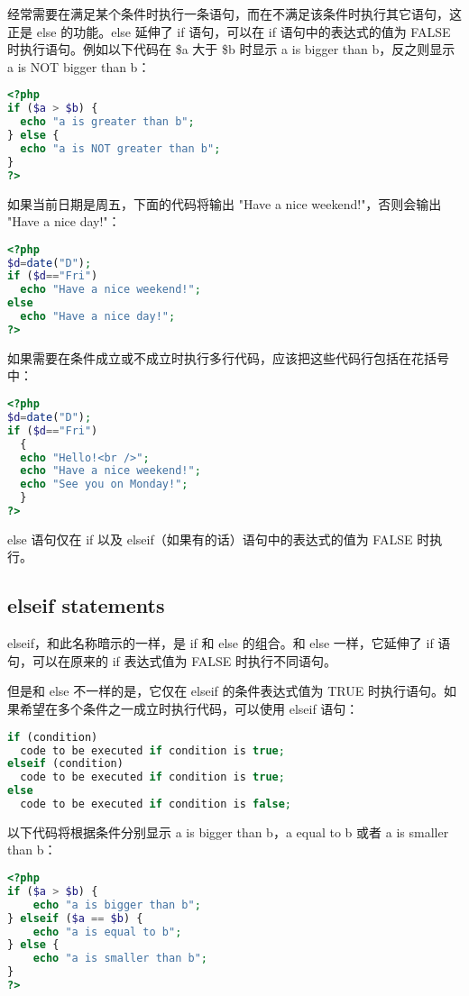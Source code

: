 经常需要在满足某个条件时执行一条语句，而在不满足该条件时执行其它语句，这正是 else 的功能。else 延伸了 if 语句，可以在 if 语句中的表达式的值为 FALSE 时执行语句。例如以下代码在 \$a 大于 \$b 时显示 a is bigger than b，反之则显示 a is NOT bigger than b：


\begin{lstlisting}[language=PHP]
<?php
if ($a > $b) {
  echo "a is greater than b";
} else {
  echo "a is NOT greater than b";
}
?>
\end{lstlisting}

如果当前日期是周五，下面的代码将输出 "Have a nice weekend!"，否则会输出 "Have a nice day!"：


\begin{lstlisting}[language=PHP]
<?php
$d=date("D");
if ($d=="Fri")
  echo "Have a nice weekend!"; 
else
  echo "Have a nice day!"; 
?>
\end{lstlisting}

如果需要在条件成立或不成立时执行多行代码，应该把这些代码行包括在花括号中：

\begin{lstlisting}[language=PHP]
<?php
$d=date("D");
if ($d=="Fri")
  {
  echo "Hello!<br />"; 
  echo "Have a nice weekend!";
  echo "See you on Monday!";
  }
?>
\end{lstlisting}

else 语句仅在 if 以及 elseif（如果有的话）语句中的表达式的值为 FALSE 时执行。


\subsection{elseif statements}

elseif，和此名称暗示的一样，是 if 和 else 的组合。和 else 一样，它延伸了 if 语句，可以在原来的 if 表达式值为 FALSE 时执行不同语句。

但是和 else 不一样的是，它仅在 elseif 的条件表达式值为 TRUE 时执行语句。如果希望在多个条件之一成立时执行代码，可以使用 elseif 语句：

\begin{lstlisting}[language=PHP]
if (condition)
  code to be executed if condition is true;
elseif (condition)
  code to be executed if condition is true;
else
  code to be executed if condition is false; 
\end{lstlisting}

以下代码将根据条件分别显示 a is bigger than b，a equal to b 或者 a is smaller than b：

\begin{lstlisting}[language=PHP]
<?php
if ($a > $b) {
    echo "a is bigger than b";
} elseif ($a == $b) {
    echo "a is equal to b";
} else {
    echo "a is smaller than b";
}
?>
\end{lstlisting}

